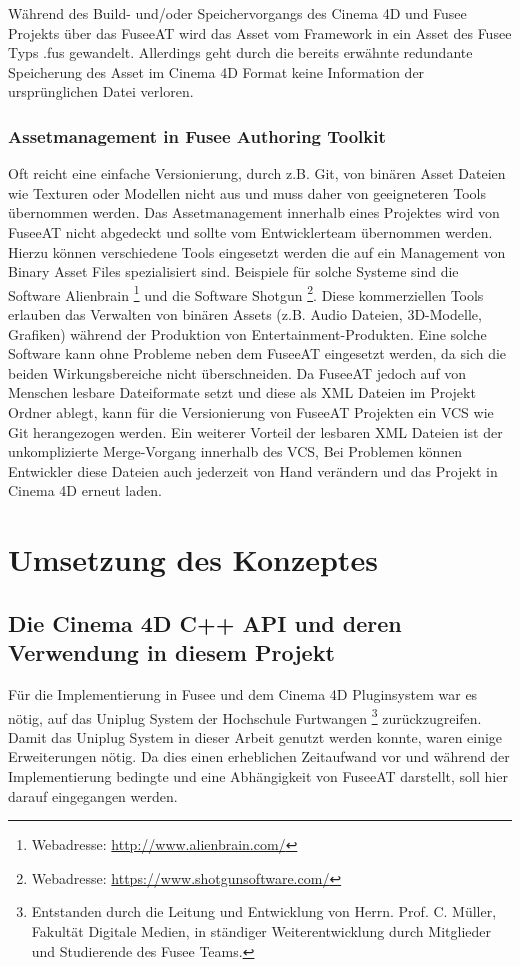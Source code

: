 \documentclass[pagesize, paper=a4, fontsize=12pt, titlepage=true, headings=small, headnosepline, abstractoff, liststotoc, nochapterprefix, plainheadsepline, twoside]{scrreprt}
\begin{document}
Während des Build- und/oder Speichervorgangs des Cinema 4D und Fusee Projekts über das FuseeAT wird das Asset vom Framework in ein Asset des Fusee Typs .fus gewandelt. Allerdings geht durch die bereits erwähnte redundante Speicherung des Asset im Cinema 4D Format keine Information der ursprünglichen Datei verloren.

\subsection{Assetmanagement in Fusee Authoring Toolkit}
Oft reicht eine einfache Versionierung, durch z.B. Git, von binären Asset Dateien wie Texturen oder Modellen nicht aus und muss daher von geeigneteren Tools übernommen werden. Das Assetmanagement innerhalb eines Projektes wird von FuseeAT nicht abgedeckt und sollte vom Entwicklerteam übernommen werden. Hierzu können verschiedene Tools eingesetzt werden die auf ein Management von Binary Asset Files spezialisiert sind. Beispiele für solche Systeme sind die Software Alienbrain \autocite{Alienbrain}\footnote{Webadresse: \url{http://www.alienbrain.com/}} und die Software Shotgun \autocite{Shotgun}\footnote{Webadresse: \url{https://www.shotgunsoftware.com/}}. Diese kommerziellen Tools erlauben das Verwalten von binären Assets (z.B. Audio Dateien, 3D-Modelle, Grafiken) während der Produktion von Entertainment-Produkten. Eine solche Software kann ohne Probleme neben dem FuseeAT eingesetzt werden, da sich die beiden Wirkungsbereiche nicht überschneiden.
Da FuseeAT jedoch auf von Menschen lesbare Dateiformate setzt und diese als XML Dateien im Projekt Ordner ablegt, kann für die Versionierung von FuseeAT Projekten ein VCS wie Git herangezogen werden. Ein weiterer Vorteil der lesbaren XML Dateien ist der unkomplizierte Merge-Vorgang innerhalb des VCS, Bei Problemen können Entwickler diese Dateien auch jederzeit von Hand verändern und das Projekt in Cinema 4D erneut laden.

\chapter{Umsetzung des Konzeptes}
\section{Die Cinema 4D C++ API und deren Verwendung in diesem Projekt}
Für die Implementierung in Fusee und dem Cinema 4D Pluginsystem war es nötig, auf das Uniplug System der Hochschule Furtwangen \footnote{Entstanden durch die Leitung und Entwicklung von Herrn. Prof. C. Müller, Fakultät Digitale Medien, in ständiger Weiterentwicklung durch Mitglieder und Studierende des Fusee Teams.} zurückzugreifen. Damit das Uniplug System in dieser Arbeit genutzt werden konnte, waren einige Erweiterungen nötig. Da dies einen erheblichen Zeitaufwand vor und während der Implementierung bedingte und eine Abhängigkeit von FuseeAT darstellt, soll hier darauf eingegangen werden.
\end{document}
